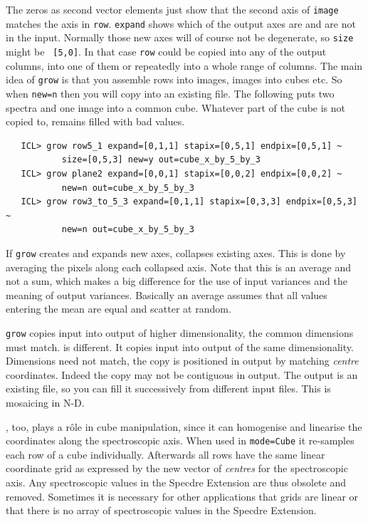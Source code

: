    The zeros as second vector elements just show that the second axis of
   {\tt image} matches the axis in {\tt row}.  {\tt expand} shows which
   of the output axes are and are not in the input.  Normally those new
   axes will of course not be degenerate, so {\tt size} might be {\tt
   [5,0]}.  In that case {\tt row} could be copied into any of the
   output columns, into one of them or repeatedly into a whole range of
   columns.  The main idea of {\tt grow} is that you assemble rows into
   images, images into cubes etc.  So when {\tt new=n} then you will
   copy into an existing file.  The following puts two spectra and one
   image into a common cube.  Whatever part of the cube is not copied
   to, remains filled with bad values.

\begin{verbatim}
   ICL> grow row5_1 expand=[0,1,1] stapix=[0,5,1] endpix=[0,5,1] ~
           size=[0,5,3] new=y out=cube_x_by_5_by_3
   ICL> grow plane2 expand=[0,0,1] stapix=[0,0,2] endpix=[0,0,2] ~
           new=n out=cube_x_by_5_by_3
   ICL> grow row3_to_5_3 expand=[0,1,1] stapix=[0,3,3] endpix=[0,5,3] ~
           new=n out=cube_x_by_5_by_3
\end{verbatim}


   If {\tt grow} creates and expands new axes,
{\tt{}}
   collapses existing axes.  This is done by averaging the pixels along
   each collapsed axis.  Note that this is an average and not a sum,
   which makes a big difference for the use of input variances and the
   meaning of output variances.  Basically an average assumes that all
   values entering the mean are equal and scatter at random.

   {\tt grow} copies input into output of higher dimensionality, the
   common dimensions must match.
{\tt{}}
   is different.  It copies input into output of the same
   dimensionality.  Dimensions need not match, the copy is positioned in
   output by matching {\it centre} coordinates.  Indeed the copy may not
   be contiguous in output.  The output is an existing file, so you can
   fill it successively from different input files.  This is mosaicing
   in N-D.

{\tt{}},
   too, plays a r\^ole in cube manipulation, since it can homogenise and
   linearise the coordinates along the spectroscopic axis.  When used in
   {\tt mode=Cube} it re-samples each row of a cube individually.
   Afterwards all rows have the same linear coordinate grid as expressed
   by the new vector of {\it centres} for the spectroscopic axis.  Any
   spectroscopic values in the Specdre Extension are thus obsolete and
   removed.  Sometimes it is necessary for other applications that grids
   are linear or that there is no array of spectroscopic values in the
   Specdre Extension.


